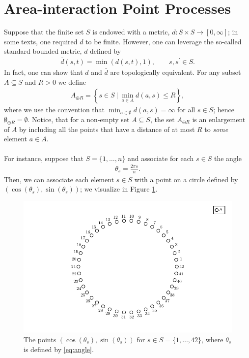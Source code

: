 \documentclass{article}
\begin{document}
\section{Area-interaction Point Processes}
Suppose that the finite set $S$ is endowed with a metric, $d:S\times S \to [0,\infty]$; in some texts, one required $d$ to be finite. However, one can leverage the so-called standard bounded metric, $\bar{d}$ defined by 
\begin{align*}
    \bar{d}(s,t) = \min\left(d(s,t), 1\right),\quad \quad s,s^\prime \in S. 
\end{align*} 
In fact, one can show that $d$ and $\bar{d}$ are topologically equivalent. For any subset $A \subseteq S$ and $R > 0$ we define  
\begin{align*}
    A_{\oplus R} = \left\{s \in S~\Big\lvert~\min_{a \in A} d(a,s) \leq R \right\},
\end{align*}
where we use the convention that $\min_{a \in \emptyset} d(a, s) = \infty$ for all $s \in S$; hence $\emptyset_{\oplus R}  = \emptyset$. Notice, that for a non-empty set $A \subseteq S$, the set $A_{\oplus R}$ is an enlargement of $A$ by including all the points that have a distance of at most $R$ to \textit{some} element $a \in A$. \\\\
For instance, suppose that $S = \{1, \dots, n\}$ and associate for each $s \in S$ the angle 
\begin{align}\label{eq:angle}
    \theta_s = \frac{2\pi s }{n}.
\end{align}
Then, we can associate each element $s \in S$ with a point on a circle defined by $(\cos(\theta_s), \sin(\theta_s))$; we visualize in Figure \ref{fig:circle-bijection}. 
\begin{figure}[ht]
    \centering
    \includegraphics[scale = 0.6]{figures/circle_bijection.pdf}
    \caption{The points $(\cos(\theta_s), \sin(\theta_s))$ for $s \in S = \{1,\dots, 42\}$, where $\theta_s$ is defined by \eqref{eq:angle}.}\label{fig:circle-bijection}
\end{figure} 
\end{document}
